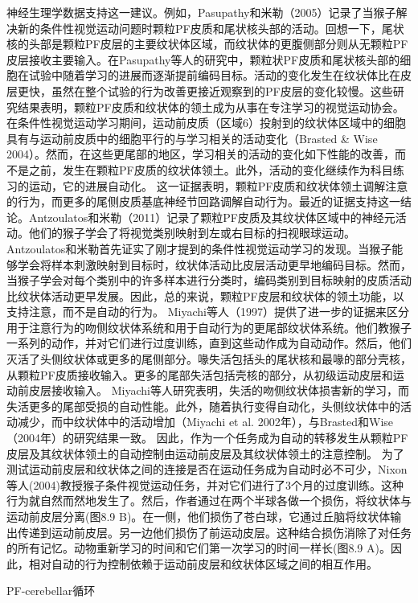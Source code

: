 神经生理学数据支持这一建议。例如，Pasupathy和米勒（2005）记录了当猴子解决新的条件性视觉运动问题时颗粒PF皮质和尾状核头部的活动。回想一下，尾状核的头部是颗粒PF皮层的主要纹状体区域，而纹状体的更腹侧部分则从无颗粒PF皮层接收主要输入。在Pasupathy等人的研究中，颗粒状PF皮质和尾状核头部的细胞在试验中随着学习的进展而逐渐提前编码目标。活动的变化发生在纹状体比在皮层更快，虽然在整个试验的行为改善更接近观察到的PF皮层的变化较慢。这些研究结果表明，颗粒PF皮质和纹状体的领土成为从事在专注学习的视觉运动协会。
在条件性视觉运动学习期间，运动前皮质（区域6）投射到的纹状体区域中的细胞具有与运动前皮质中的细胞平行的与学习相关的活动变化（Brasted \& Wise 2004）。然而，在这些更尾部的地区，学习相关的活动的变化如下性能的改善，而不是之前，发生在颗粒PF皮质的纹状体领土。此外，活动的变化继续作为科目练习的运动，它的进展自动化。
这一证据表明，颗粒PF皮质和纹状体领土调解注意的行为，而更多的尾侧皮质基底神经节回路调解自动行为。最近的证据支持这一结论。Antzoulatos和米勒（2011）记录了颗粒PF皮质及其纹状体区域中的神经元活动。他们的猴子学会了将视觉类别映射到左或右目标的扫视眼球运动。Antzoulatos和米勒首先证实了刚才提到的条件性视觉运动学习的发现。当猴子能够学会将样本刺激映射到目标时，纹状体活动比皮层活动更早地编码目标。然而，当猴子学会对每个类别中的许多样本进行分类时，编码类别到目标映射的皮质活动比纹状体活动更早发展。因此，总的来说，颗粒PF皮层和纹状体的领土功能，以支持注意，而不是自动的行为。
Miyachi等人（1997）提供了进一步的证据来区分用于注意行为的吻侧纹状体系统和用于自动行为的更尾部纹状体系统。他们教猴子一系列的动作，并对它们进行过度训练，直到这些动作成为自动动作。然后，他们灭活了头侧纹状体或更多的尾侧部分。喙失活包括头的尾状核和最喙的部分壳核，从颗粒PF皮质接收输入。更多的尾部失活包括壳核的部分，从初级运动皮层和运动前皮层接收输入。
Miyachi等人研究表明，失活的吻侧纹状体损害新的学习，而失活更多的尾部受损的自动性能。此外，随着执行变得自动化，头侧纹状体中的活动减少，而中纹状体中的活动增加（Miyachi et al. 2002年），与Brasted和Wise（2004年）的研究结果一致。
因此，作为一个任务成为自动的转移发生从颗粒PF皮层及其纹状体领土的自动控制由运动前皮层及其纹状体领土的注意控制。
为了测试运动前皮层和纹状体之间的连接是否在运动任务成为自动时必不可少，Nixon等人(2004)教授猴子条件视觉运动任务，并对它们进行了3个月的过度训练。这种行为就自然而然地发生了。然后，作者通过在两个半球各做一个损伤，将纹状体与运动前皮层分离(图8.9 B)。在一侧，他们损伤了苍白球，它通过丘脑将纹状体输出传递到运动前皮层。另一边他们损伤了前运动皮层。这种结合损伤消除了对任务的所有记忆。动物重新学习的时间和它们第一次学习的时间一样长(图8.9 A)。因此，相对自动的行为控制依赖于运动前皮层和纹状体区域之间的相互作用。

PF-cerebellar循环

